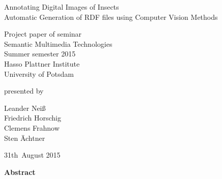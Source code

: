 \documentclass[11pt, a4paper]{article}
\begin{document}
          

\begin{titlepage}
  \begin{center} 
    \mbox{}
    \vspace{1cm}
    
    {\huge Annotating Digital Images of Insects \\[1em] {\LARGE Automatic Generation of RDF files using Computer Vision Methods}}  
        
    \vspace{4cm}
    
    Project paper of seminar \\[1em]
    {\large \sc Semantic Multimedia Technologies} \\[1em]
    Summer semester 2015 \\[1em]
    Hasso Plattner Institute \\[1em]
    University of Potsdam
    
    \vspace{4cm}
    
		presented by
		
    \vspace{1em}
    
		{\Large Leander Neiß} \\
		{\Large Friedrich Horschig}\\
		{\Large Clemens Frahnow}\\
		{\Large Sten Ächtner}
		
    \vspace{4em}
    
    31th~August 2015
  \end{center}
\end{titlepage}


\setcounter{page}{1}

\begin{center}
{\bf Abstract} 
\end{center}

\noindent


\newpage

\tableofcontents 

\newpage

 
\newpage

\newpage

\newpage

\newpage

\newpage



\newpage




\end{document}
